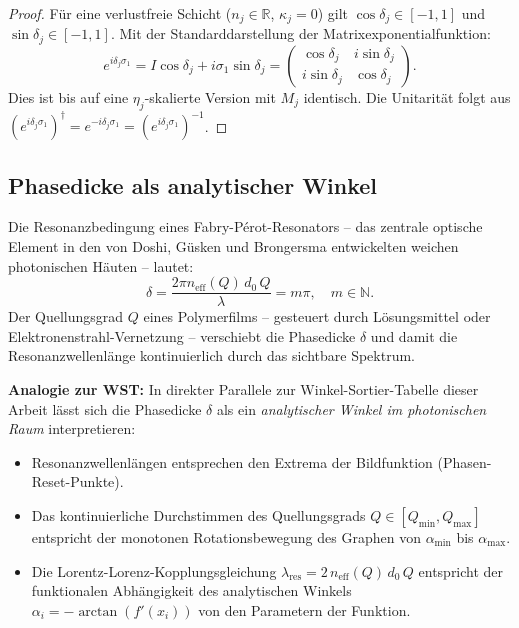 ﻿\documentclass[12pt, a4paper]{article}
\theoremstyle{definition}
\begin{document}
	\begin{proof}
		Für eine verlustfreie Schicht ($n_j \in \mathbb{R}$, $\kappa_j = 0$) gilt
		$\cos\delta_j \in [-1,1]$ und $\sin\delta_j \in [-1,1]$.
		Mit der Standarddarstellung der Matrixexponentialfunktion:
		\[
		e^{i\delta_j \sigma_1} = I\cos\delta_j + i\sigma_1\sin\delta_j
		= \begin{pmatrix}\cos\delta_j & i\sin\delta_j \\ i\sin\delta_j & \cos\delta_j\end{pmatrix}.
		\]
		Dies ist bis auf eine $\eta_j$-skalierte Version mit $M_j$ identisch.
		Die Unitarität folgt aus $(e^{i\delta_j\sigma_1})^\dagger = e^{-i\delta_j\sigma_1} = (e^{i\delta_j\sigma_1})^{-1}$.
	\end{proof}
	
	\subsection{Phasedicke als analytischer Winkel}
	
	Die Resonanzbedingung eines Fabry-Pérot-Resonators -- das zentrale optische
	Element in den von Doshi, Güsken und Brongersma \cite{oqtum} entwickelten
	weichen photonischen Häuten -- lautet:
	\[
	\delta = \frac{2\pi n_\mathrm{eff}(Q)\, d_0\, Q}{\lambda} = m\pi, \quad m \in \mathbb{N}.
	\]
	Der Quellungsgrad $Q$ eines Polymerfilms -- gesteuert durch Lösungsmittel
	oder Elektronen\-strahl-Vernetzung -- verschiebt die Phasedicke $\delta$ und
	damit die Resonanzwellenlänge kontinuierlich durch das sichtbare Spektrum.
	
	\medskip
	\noindent\textbf{Analogie zur WST:} In direkter Parallele zur
	Winkel-Sortier-Tabelle dieser Arbeit lässt sich die Phasedicke $\delta$ als
	ein \emph{analytischer Winkel im photonischen Raum} interpretieren:
	\begin{itemize}
		\item Resonanzwellenlängen entsprechen den Extrema der Bildfunktion (Phasen-Reset-Punkte).
		\item Das kontinuierliche Durchstimmen des Quellungsgrads $Q \in [Q_\mathrm{min}, Q_\mathrm{max}]$
		entspricht der monotonen Rotationsbewegung des Graphen von
		$\alpha_\mathrm{min}$ bis $\alpha_\mathrm{max}$.
		\item Die Lorentz-Lorenz-Kopplungsgleichung
		$\lambda_\mathrm{res} = 2\, n_\mathrm{eff}(Q)\, d_0\, Q$
		entspricht der funktionalen Abhängigkeit des analytischen Winkels
		$\alpha_i = -\arctan(f'(x_i))$ von den Parametern der Funktion.
	\end{itemize}
	
\end{document}
